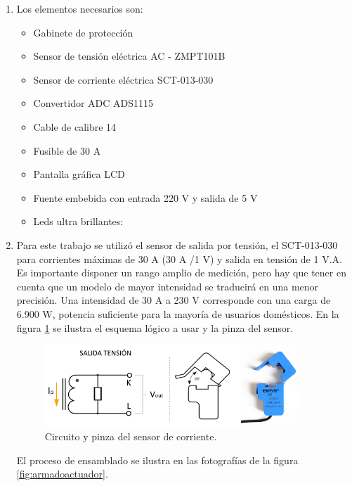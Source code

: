 \begin{enumerate}
\item {}

Los elementos necesarios son:
\begin{itemize}
\item Gabinete de protección
\item Sensor de tensión eléctrica AC - ZMPT101B
\item Sensor de corriente eléctrica SCT-013-030
\item Convertidor ADC ADS1115
\item Cable de calibre 14
\item Fusible de 30 A
\item Pantalla gráfica LCD
\item Fuente embebida con entrada 220 V y salida de 5 V
\item Leds ultra brillantes:
\end{itemize}

\item {}

Para este trabajo se utilizó el sensor de salida por tensión, el SCT-013-030 para corrientes máximas de 30 A (30 A /1 V) y salida en tensión de 1 V.A. Es importante disponer un rango amplio de medición, pero hay que tener en cuenta que un modelo de mayor intensidad se traducirá en una menor precisión. Una intensidad de 30 A a 230 V corresponde con una carga de 6.900 W, potencia suficiente para la mayoría de usuarios domésticos. En la figura \ref{fig:consumo1} se ilustra el esquema lógico a usar y la pinza del sensor.
\vspace{1.0cm}
\begin{figure}[htpb]
\centering 
\includegraphics[width=0.9\textwidth]{./Figures/consumo1.png}
\caption{Circuito y pinza del sensor de corriente. }
\label{fig:consumo1}
\end{figure}

El proceso de ensamblado se ilustra en las fotografías de la figura \ref{fig:armadoactuador}.


\end{enumerate}
